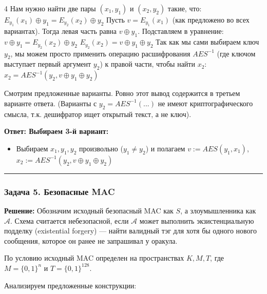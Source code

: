 ﻿\documentclass[8pt,a4paper,landscape]{extarticle}
\newcommand{\tightlist}{}
\begin{document}
\begin{multicols*}{4}
Нам нужно найти две пары \((x_1, y_1)\) и \((x_2, y_2)\) такие, что: \(E_{y_1}(x_1) \oplus y_1 = E_{y_2}(x_2) \oplus y_2\) Пусть \(v = E_{y_1}(x_1)\) (как предложено во всех вариантах). Тогда левая часть равна \(v \oplus y_1\). Подставляем в уравнение: \(v \oplus y_1 = E_{y_2}(x_2) \oplus y_2\) \(E_{y_2}(x_2) = v \oplus y_1 \oplus y_2\) Так как мы сами выбираем ключ \(y_2\), мы можем просто применить операцию расшифрования \(AES^{-1}\) (где ключом выступает первый аргумент \(y_2\)) к правой части, чтобы найти \(x_2\): \(x_2 = AES^{-1}(y_2, v \oplus y_1 \oplus y_2)\)

Смотрим предложенные варианты. Ровно этот вывод содержится в третьем варианте ответа. (Варианты с \(y_2 = AES^{-1}(...)\) не имеют криптографического смысла, т.к. дешифратор ищет открытый текст, а не ключ).

\textbf{Ответ: Выбираем 3-й вариант:}

\begin{itemize}
\tightlist
\item
  Выбираем \(x_1, y_1, y_2\) произвольно (\(y_1 \neq y_2\)) и полагаем \(v := AES(y_1, x_1)\), \(x_2 := AES^{-1}(y_2, v \oplus y_1 \oplus y_2)\)
\end{itemize}

\begin{center}\rule{0.5\linewidth}{0.5pt}\end{center}

\subsubsection{Задача 5. Безопасные MAC}\label{ux437ux430ux434ux430ux447ux430-5.-ux431ux435ux437ux43eux43fux430ux441ux43dux44bux435-mac}

\textbf{Решение:} Обозначим исходный безопасный MAC как \(S\), а злоумышленника как \(\mathcal{A}\). Схема считается небезопасной, если \(\mathcal{A}\) может выполнить экзистенциальную подделку (existential forgery) --- найти валидный тэг для хотя бы одного нового сообщения, которое он ранее не запрашивал у оракула.

По условию исходный MAC определен на пространствах \(K, M, T\), где \(M=\{0,1\}^n\) и \(T=\{0,1\}^{128}\).

Анализируем предложенные конструкции:


\end{multicols*}
\end{document}
